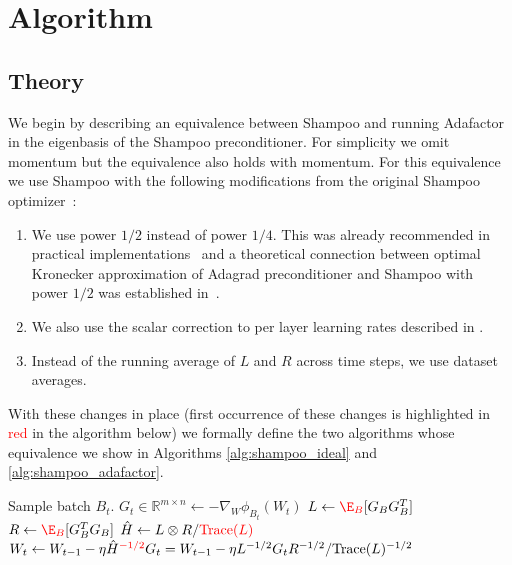 \documentclass{article} %
\newcommand{\red}[1]{\textcolor{red}{#1}}
\begin{document}
\section{Algorithm}
\label{sec:alg}

\subsection{Theory}



We begin by describing an equivalence between Shampoo and running Adafactor in the eigenbasis of the Shampoo preconditioner. For simplicity we omit momentum but the equivalence also holds with momentum. For this equivalence we  use Shampoo with the following modifications from the original Shampoo optimizer~\citep{shampoo}:
\begin{enumerate}
    \item We  use power $1/2$ instead of power $1/4$. This was already recommended in practical implementations~\citep{anil2020scalable,distributedshampoo} and a theoretical connection between optimal Kronecker approximation of Adagrad \citep{adagrad} preconditioner and Shampoo with power $1/2$ was established in~\cite{whyshampoo}. 
    \item  We also use the scalar correction to per layer learning rates described in \citet{yi21,whyshampoo}.
    \item Instead of the running average of $L$ and $R$ across time steps, we use dataset averages.
\end{enumerate}

With these changes in place (first occurrence of these changes is highlighted in \red{red} in the algorithm below) we formally define the two algorithms whose equivalence we  show in Algorithms \ref{alg:shampoo_ideal} and \ref{alg:shampoo_adafactor}.

\begin{algorithm}[H]

\begin{algorithmic}[1]
    \STATE Sample batch $B_t$.
    \STATE $G_{t} \in \mathbb{R}^{m \times n} \gets -\nabla_W \phi_{B_t}(W_t)$
    \STATE $L \gets \red{\E_{B}}[G_{B}G_{B}^T]$ 
    \STATE $R \gets \red{\E_{B}}[G_{B}^TG_{B}]$
    \STATE $\hat{H} \gets L \otimes R / \red{\text{Trace}(L)}$
    \STATE $W_t \gets W_{t-1} - \eta \hat{H}^{\red{-1/2}}G_{t} = W_{t-1} - \eta L^{-1/2}G_{t}R^{-1/2}/ \text{Trace}(L)^{-1/2}$
\end{algorithmic}
\caption{Single step of idealized Shampoo with power $1/2$.}
\label{alg:shampoo_ideal}
\end{algorithm}
\end{document}
